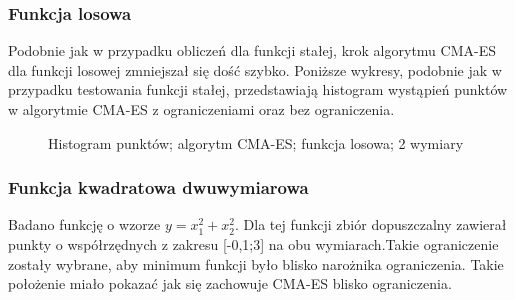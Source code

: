 \documentclass{mini}
\begin{document}
\subsubsection*{Funkcja losowa}
\hspace{3,4ex}Podobnie jak w przypadku obliczeń dla funkcji stałej, krok algorytmu CMA-ES dla funkcji losowej zmniejszał się dość szybko. Poniższe wykresy, podobnie jak w przypadku testowania funkcji stałej, przedstawiają histogram wystąpień punktów w algorytmie CMA-ES z ograniczeniami oraz bez ograniczenia.

\begin{figure}[H]
\centering
{}
\quad
{}
\caption{Histogram punktów; algorytm CMA-ES; funkcja losowa; 2 wymiary}
\end{figure}

\subsubsection*{Funkcja kwadratowa dwuwymiarowa}
\hspace{3,4ex}Badano funkcję o wzorze $y=x_1^2+x_2^2$. Dla tej funkcji zbiór dopuszczalny zawierał punkty o współrzędnych z zakresu [-0,1;3] na obu wymiarach.Takie ograniczenie zostały wybrane, aby minimum funkcji było blisko narożnika ograniczenia. Takie położenie miało pokazać jak się zachowuje CMA-ES blisko ograniczenia.
\end{document}
